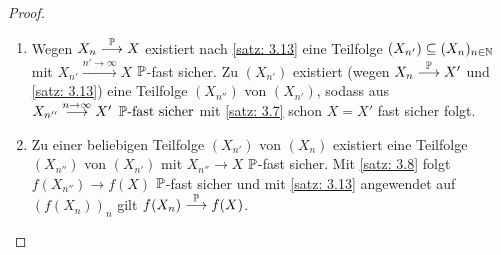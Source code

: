 \begin{proof}
	\begin{enumerate}[label=(zu \alph*), leftmargin=*]
		\item Wegen $X_n \probto X$ existiert nach \cref{satz: 3.13} eine Teilfolge $(X_{n'}) \subseteq(X_n)_{n \in \N}$ mit $X_{n'}
		\overset{n' \to \infty}{\longrightarrow} X$ $\P$-fast sicher.
		Zu $(X_{n'})$ existiert (wegen $X_n\probto X'$ und \cref{satz: 3.13}) eine Teilfolge $(X_{n''})$ von $(X_{n'})$, sodass aus $X_{n''}	\ntoinf  X' \enskip \P\text{-fast sicher}$ mit \cref{satz: 3.7} schon $X = X'$ fast sicher folgt.
		\item Zu einer beliebigen Teilfolge $(X_{n'})$ von $(X_n)$ existiert eine Teilfolge $(X_{n''})$ von $(X_{n'})$ mit $X_{n''} \to X$ $\P$-fast sicher.
		Mit \cref{satz: 3.8} folgt $f(X_{n''}) \to f(X)$ $\P$-fast sicher und mit \cref{satz: 3.13} angewendet auf $(f(X_n))_n$ gilt $f(X_n) \probto f(X)$.
	\end{enumerate}
\end{proof}